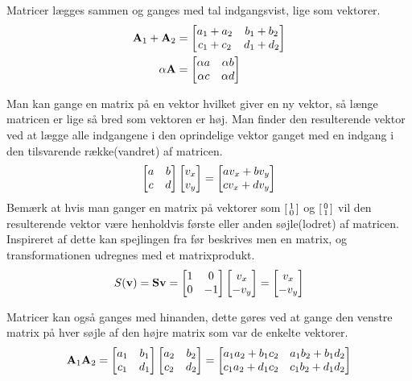 Matricer lægges sammen og ganges med tal indgangsvist, lige som vektorer.
\begin{align}
\mathbf{A}_1+\mathbf{A}_2 &= \begin{bmatrix}
a_1+a_2&b_1+b_2\\c_1+c_2&d_1+d_2
\end{bmatrix}\\
\alpha \mathbf{A} &= \begin{bmatrix}
\alpha a & \alpha b\\
\alpha c & \alpha d
\end{bmatrix}
\end{align} 

Man kan gange en matrix på en vektor hvilket giver en ny vektor, så længe matricen er lige så bred som vektoren er høj. Man finder den resulterende vektor ved at lægge alle indgangene i den oprindelige vektor ganget med en indgang i den tilsvarende række(vandret) af matricen. 
\begin{equation}
\begin{bmatrix}
a&b\\c&d
\end{bmatrix}
\begin{bmatrix} v_x \\ v_y \end{bmatrix} = \begin{bmatrix} av_x+bv_y \\ cv_x+dv_y \end{bmatrix}
\end{equation}
Bemærk at hvis man ganger en matrix på vektorer som $\begin{bsmallmatrix}1\\0\end{bsmallmatrix}$ og $\begin{bsmallmatrix}0\\1\end{bsmallmatrix}$ vil den resulterende vektor være henholdvis første eller anden søjle(lodret) af matricen. Inspireret af dette kan spejlingen fra før beskrives men en matrix, og transformationen udregnes med et matrixprodukt.
\begin{equation}
S(\mathbf{v})=\mathbf{S} \mathbf{v} = \begin{bmatrix}
1 & 0\\
0 & -1
\end{bmatrix}
\begin{bmatrix} v_x \\ -v_y \end{bmatrix} = \begin{bmatrix} v_x \\ -v_y \end{bmatrix}
\end{equation}

Matricer kan også ganges med hinanden, dette gøres ved at gange den venstre matrix på hver søjle af den højre matrix som var de enkelte vektorer.
\begin{equation}
\mathbf{A}_1 \mathbf{A}_2 = 
\begin{bmatrix}
a_1&b_1\\c_1&d_1
\end{bmatrix}
\begin{bmatrix}
a_2&b_2\\c_2&d_2
\end{bmatrix}
=
\begin{bmatrix}
a_1a_2+b_1c_2&a_1b_2+b_1d_2\\
c_1a_2+d_1c_2&c_1b_2+d_1d_2
\end{bmatrix}
\end{equation}

